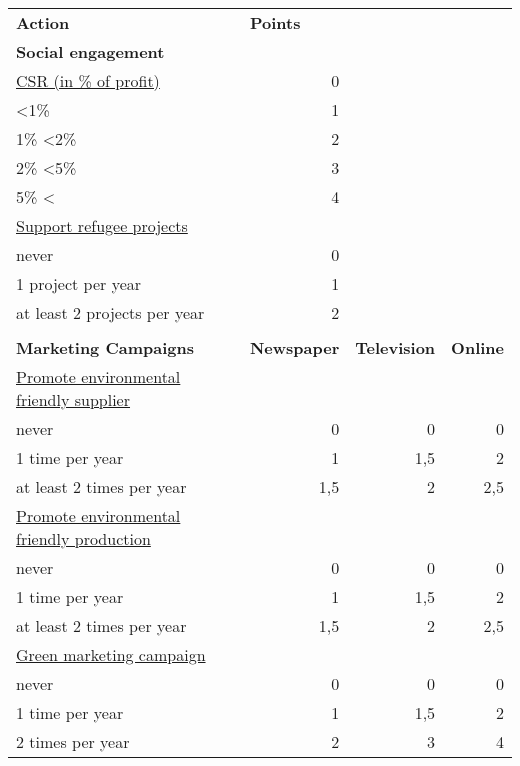 \begin{table}[]
\begin{tabular}{|l|r|r|r|}
\hline
\multicolumn{1}{|l|}{\textbf{Action}}             & \multicolumn{1}{l|}{\textbf{Points}} & \multicolumn{1}{l|}{}       & \multicolumn{1}{l|}{}   \\
\textbf{Social engagement}        &       &       &  \\
\underline{CSR (in \% of profit)} & 0     &       &  \\
\textless 1\%                     & 1     &       &  \\
1\% \textless 2\%                 & 2     &       &  \\
2\% \textless 5\%                 & 3     &       &  \\
5\% \textless{}                   & 4     &       &  \\
\underline{Support refugee projects}  &   &       &  \\
never                             & 0     &       &  \\
1 project per year                & 1     &       &  \\
at least 2 projects per year      & 2     &       &  \\
&  &  &  \\
\textbf{Marketing Campaigns}  & \textbf{Newspaper} & \textbf{Television} & \textbf{Online} \\
\underline{Promote environmental friendly supplier}   & & & \\
never                             & 0    & 0      & 0 \\
1 time per year                   & 1    & 1,5    & 2 \\
at least 2 times per year         & 1,5  & 2      & 2,5 \\
\underline{Promote environmental friendly production} & & & \\
never                             & 0    & 0      & 0 \\
1 time per year                   & 1    & 1,5    & 2 \\
at least 2 times per year         & 1,5  & 2      & 2,5 \\
\underline{Green marketing campaign} & & & \\
never                             & 0    & 0      & 0 \\
1 time per year                   & 1    & 1,5    & 2 \\
2 times per year                  & 2    & 3      & 4 \\

\end{tabular}
\end{table}

